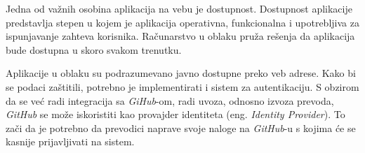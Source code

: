 Jedna od važnih osobina aplikacija na vebu je dostupnost. Dostupnost aplikacije predstavlja stepen u kojem je 
aplikacija operativna, funkcionalna i upotrebljiva za ispunjavanje zahteva korisnika. 
Računarstvo u oblaku pruža rešenja da aplikacija bude dostupna u skoro svakom trenutku.

Aplikacije u oblaku su podrazumevano javno dostupne preko veb adrese. Kako bi se podaci zaštitili,
potrebno je implementirati i sistem za autentikaciju. S obzirom da se već radi integracija sa \textit{GiHub}-om, radi
uvoza, odnosno izvoza prevoda, \textit{GitHub} se može iskoristiti kao provajder identiteta (eng. \textit{Identity Provider}).
To zači da je potrebno da prevodici naprave svoje naloge na \textit{GitHub}-u s kojima će se kasnije prijavljivati 
na sistem.